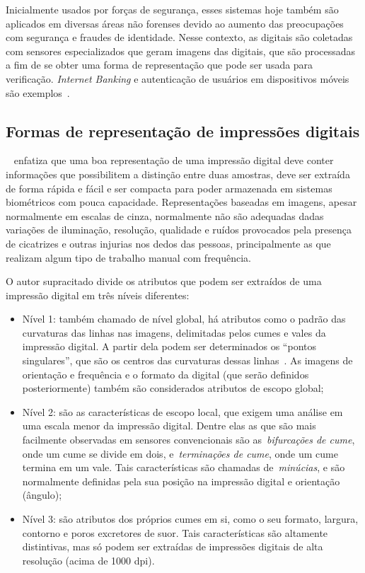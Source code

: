 Inicialmente usados por forças de segurança, esses sistemas hoje também são aplicados em diversas áreas não forenses devido ao aumento das preocupações com segurança e fraudes de identidade. Nesse contexto, as digitais são coletadas com sensores especializados que geram imagens das digitais, que são processadas a fim de se obter uma forma de representação que pode ser usada para verificação. \textit{Internet Banking} e autenticação de usuários em dispositivos móveis são exemplos~\cite{HandbookOfBiometrics}.

\subsection{Formas de representação de impressões digitais}\label{subsec:representacao_de_digitais}

~ enfatiza que uma boa representação de uma impressão digital deve conter informações que possibilitem a distinção entre duas amostras, deve ser extraída de forma rápida e fácil e ser compacta para poder armazenada em sistemas biométricos com pouca capacidade. Representações baseadas em imagens, apesar normalmente em escalas de cinza, normalmente não são adequadas dadas variações de iluminação, resolução, qualidade e ruídos provocados pela presença de cicatrizes e outras injurias nos dedos das pessoas, principalmente as que realizam algum tipo de trabalho manual com frequência.

O autor supracitado divide os atributos que podem ser extraídos de uma impressão digital em três níveis diferentes:
\begin{itemize}
    \item{Nível 1}: também chamado de nível global, há atributos como o padrão das curvaturas das linhas nas imagens, delimitadas pelos cumes e vales da impressão digital. A partir dela podem ser determinados os ``pontos singulares'', que são os centros das curvaturas dessas linhas~\cite{LEVI1972327}. As imagens de orientação e frequência e o formato da digital (que serão definidos posteriormente) também são considerados atributos de escopo global;
    \item{Nível 2}: são as características de escopo local, que exigem uma análise em uma escala menor da impressão digital. Dentre elas as que são mais facilmente observadas em sensores convencionais são as~\textit{bifurcações de cume}, onde um cume se divide em dois, e~\textit{terminações de cume}, onde um cume termina em um vale. Tais características são chamadas de~\textit{minúcias}, e são normalmente definidas pela sua posição na impressão digital e orientação (ângulo);
    \item{Nível 3}: são atributos dos próprios cumes em si, como o seu formato, largura, contorno e poros excretores de suor. Tais características são altamente distintivas, mas só podem ser extraídas de impressões digitais de alta resolução (acima de 1000 dpi).
\end{itemize}


